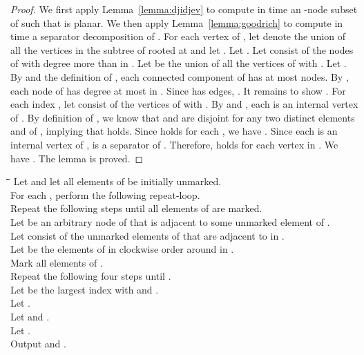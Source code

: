 \documentclass[12pt]{article}
\begin{document}
\begin{proof}
We first apply Lemma~\ref{lemma:djidjev} to compute in  time an
-node subset  of  such that
 is planar.  We then apply Lemma~\ref{lemma:goodrich}
to compute in  time a separator decomposition  of
.  For each vertex  of , let  denote the
union of all the vertices in the subtree of  rooted at  and let
.  Let .  Let  consist of the nodes
of  with degree more than  in .  Let  be the union of
all the vertices  of  with .  Let .  By  and the definition of , each
connected component of  has at most  nodes.  By
, each node of  has degree at most
 in .  Since  has  edges,
.
It remains to show .  For each index
, let  consist of the vertices  of  with
.
By  and , each  is an internal vertex
of .  By definition of , we know that  and  are
disjoint for any two distinct elements  and  of ,
implying that  holds.  Since
 holds for each , we have
.  Since each 
is an internal vertex of ,  is a separator of .
Therefore,  holds for each vertex  in
.  We have .
The lemma is proved.
\end{proof}





\begin{algorithm}[t]
{
\begin{minipage}[t]{1cm}
\begin{tabbing}
\quad\=\quad\=\quad\=\quad\=\quad\=\quad\=\quad\=\kill
Let  and let all elements of  be initially unmarked.\\
For each , perform the following repeat-loop.\\
\>Repeat the following steps until all elements of  are marked.\\
\>\>Let  be an arbitrary node of  that is adjacent to some
unmarked element of .\\
\>\>Let  consist of the unmarked elements of  that are
adjacent to  in .\\
\>\>Let  be the elements
of  in clockwise order around  in .\\
\>\>Mark all  elements of .\\
\>\>Repeat the following four steps until .\\
\>\>\>Let  be the largest index with  and
.\\
\>\>\>Let .\\
\>\>\>Let  and .\\
\>\>\>Let .\\
Output  and .
\end{tabbing}
\end{minipage}
}
\caption{}
\label{algorithm:clustering}
\end{algorithm}
\end{document}
